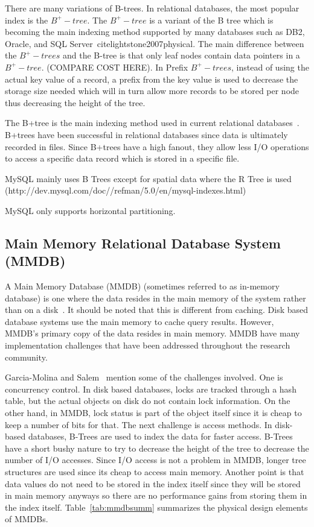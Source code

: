 \documentclass[12pt,a4paper]{article}
\begin{document}
There are many variations of B-trees. In relational databases, the most popular index is the $B^{+}-tree$. The $B^{+}-tree$ is a variant of the B  tree which is
becoming the main indexing method supported by many databases such as DB2, Oracle, and SQL Server~cite{lightstone2007physical}. The main difference between the
$B^{+}-trees$ and the B-tree is that only leaf nodes contain data pointers in a $B^{+}-tree$. (COMPARE COST HERE). In Prefix $B^{+}-trees$, instead of using the
actual key value of a record, a prefix from the key value is used to decrease the storage size needed which will in turn allow more records to be stored per
node thus decreasing the height of the tree.

The B+tree is the main indexing method used in current relational databases~\cite{lightstone2007physical}. B+trees have been successful in relational databases
since data is ultimately recorded in files. Since B+trees have a high fanout, they allow less I/O operations to access a specific data record which is stored in
a specific file.

MySQL mainly uses B Trees except for spatial data where the R Tree is used (http://dev.mysql.com/doc//refman/5.0/en/mysql-indexes.html)


MySQL only supports horizontal partitioning.

\subsection{Main Memory Relational Database System (MMDB)}
\label{SEC-MMDB}

A Main Memory Database (MMDB) (sometimes referred to as in-memory database) is one where the data resides in the main memory of the system rather than on a
disk~\cite{garcia1992main}. It should be noted that this is different from caching. Disk based database systems use the main memory to cache query results.
However, MMDB's primary copy of the data resides in main memory. MMDB have many implementation challenges that have been addressed throughout the research
community.


Garcia-Molina and Salem~\cite{garcia1992main} mention some of the challenges involved. One is concurrency control. In disk based databases, locks are tracked
through a hash table, but the actual objects on disk do not contain lock information. On the other hand, in MMDB, lock status is part of the object itself since
it is cheap to keep a number of bits for that. The next challenge is access methods. In disk-based databases, B-Trees are used to index the data for faster
access. B-Trees have a short bushy nature to try to decrease the height of the tree to decrease the number of I/O accesses. Since I/O access is not a problem in
MMDB, longer tree structures are used since its cheap to access main memory. Another point is that data values do not need to be stored in the index itself
since they will be stored in main memory anyways so there are no performance gains from storing them in the index itself. Table~\ref{tab:mmdbsumm} summarizes
the physical design elements of MMDBs.
\end{document}
